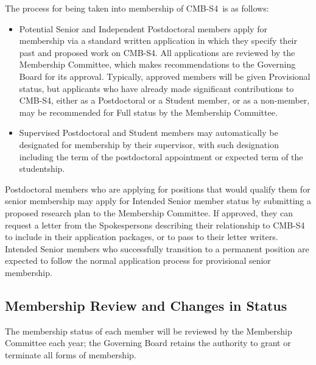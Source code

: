 \documentclass[12pt]{article}
\newcommand\collabname{CMB-S4}
\begin{document}
The process for being taken into membership of \collabname\ is as follows:

\begin{itemize}

\item Potential Senior and Independent Postdoctoral members apply for membership via a standard written application in which they specify their past and proposed work on \collabname. All applications are reviewed by the Membership Committee, which makes recommendations to the Governing Board for its approval. Typically, approved members will be given Provisional status, but applicants who have already made significant contributions to CMB-S4, either as a Postdoctoral or a Student member, or as a non-member, may be recommended for Full status by the Membership Committee.

\item Supervised Postdoctoral and Student members may automatically be designated for membership by their supervisor, with such designation including the term of the postdoctoral appointment or expected term of the studentship.

\end{itemize}

Postdoctoral members who are applying for positions that would qualify them for senior membership may apply for Intended Senior member status by submitting a proposed research plan to the Membership Committee. If approved, they can request a letter from the Spokespersons describing their relationship to CMB-S4 to include in their application packages, or to pass to their letter writers.  Intended Senior members who successfully transition to a permanent position are expected to follow the normal application process for provisional senior membership.

\subsection{Membership Review and Changes in Status}

The membership status of each member will be reviewed by the Membership Committee each year; the Governing Board retains the authority to grant or terminate all forms of membership.
\end{document}
